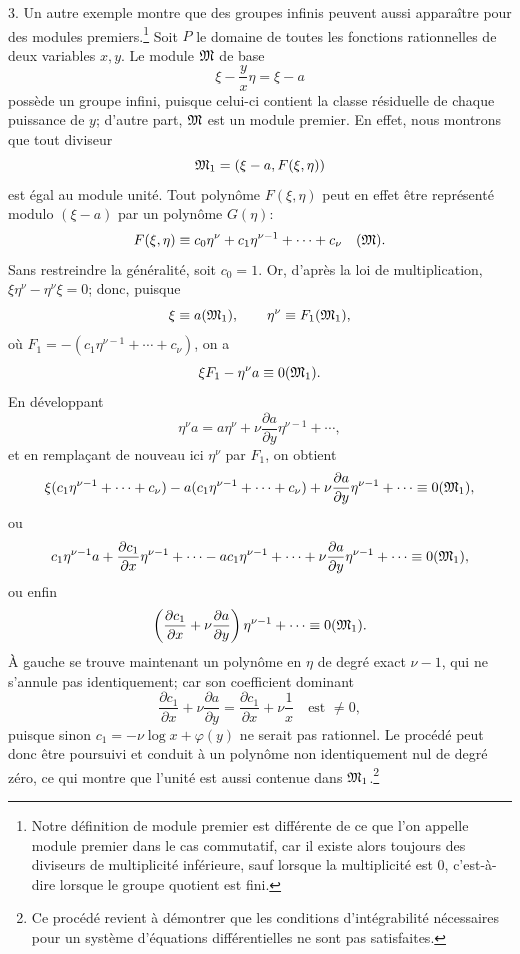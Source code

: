 3. Un autre exemple montre que des groupes infinis peuvent aussi apparaître pour des modules premiers.\footnote{Notre définition de \og{} module premier \fg{} est différente de ce que l'on appelle module premier dans le cas commutatif, car il existe alors toujours des diviseurs de multiplicité inférieure, sauf lorsque la multiplicité est $0$, c'est-à-dire lorsque le groupe quotient est fini.} Soit $P$ le domaine de toutes les fonctions rationnelles de deux variables $x,y$. Le module $\mathfrak{M}$ de base
\[
 \xi-\frac{y}{x}\eta=\xi-a
\]
possède un groupe infini, puisque celui-ci contient la classe résiduelle de chaque puissance de $y$; d'autre part, $\mathfrak{M}$ est un module premier. En effet, nous montrons que tout diviseur
\[
 \mathfrak{M}_1=(\xi-a,F(\xi,\eta))
\]
est égal au module unité. Tout polynôme $F(\xi,\eta)$ peut en effet être représenté modulo $(\xi-a)$ par un polynôme $G(\eta)$:
\[
 F(\xi,\eta)\equiv c_0\eta^\nu+c_1\eta^{\nu-1}+\cdots+c_\nu\quad(\mathfrak{M}).
\]
Sans restreindre la généralité, soit $c_0=1$. Or, d'après la loi de multiplication, $\xi\eta^\nu-\eta^\nu\xi=0$; donc, puisque
\[
 \xi\equiv a(\mathfrak{M}_1),
 \qquad
 \eta^\nu\equiv F_1(\mathfrak{M}_1),
\]
où $F_1=-(c_1\eta^{\nu-1}+\cdots+c_\nu)$, on a
\[
 \xi F_1-\eta^\nu a\equiv0(\mathfrak{M}_1).
\]
En développant
\[
 \eta^\nu a=a\eta^\nu+\nu\frac{\partial a}{\partial y}\eta^{\nu-1}+\cdots,
\]
et en remplaçant de nouveau ici $\eta^\nu$ par $F_1$, on obtient
\[
 \xi(c_1\eta^{\nu-1}+\cdots+c_\nu)-a(c_1\eta^{\nu-1}+\cdots+c_\nu)
 +\nu\frac{\partial a}{\partial y}\eta^{\nu-1}+\cdots\equiv0(\mathfrak{M}_1),
\]
ou
\[
 c_1\eta^{\nu-1}a+\frac{\partial c_1}{\partial x}\eta^{\nu-1}+\cdots
 -ac_1\eta^{\nu-1}+\cdots+
 \nu\frac{\partial a}{\partial y}\eta^{\nu-1}+\cdots
 \equiv0(\mathfrak{M}_1),
\]
ou enfin
\[
 \left(\frac{\partial c_1}{\partial x}+\nu\frac{\partial a}{\partial y}\right)\eta^{\nu-1}+\cdots
 \equiv0(\mathfrak{M}_1).
\]
À gauche se trouve maintenant un polynôme en $\eta$ de degré exact $\nu-1$, qui ne s'annule pas identiquement; car son coefficient dominant
\[
 \frac{\partial c_1}{\partial x}+\nu\frac{\partial a}{\partial y}
 =\frac{\partial c_1}{\partial x}+\nu\frac{1}{x}
 \quad\text{est }\ne0,
\]
puisque sinon $c_1=-\nu\log x+\varphi(y)$ ne serait pas rationnel. Le procédé peut donc être poursuivi et conduit à un polynôme non identiquement nul de degré zéro, ce qui montre que l'unité est aussi contenue dans $\mathfrak{M}_1$.\footnote{Ce procédé revient à démontrer que les conditions d'intégrabilité nécessaires pour un système d'équations différentielles ne sont pas satisfaites.}

